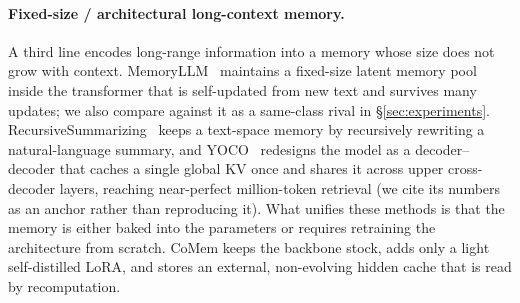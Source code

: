 \paragraph{Fixed-size / architectural long-context memory.} A third line encodes
long-range information into a memory whose size does not grow with context.
MemoryLLM~\citep{memoryllm} maintains a fixed-size latent memory pool inside the
transformer that is self-updated from new text and survives many updates; we
also compare against it as a same-class rival in \S\ref{sec:experiments}.
RecursiveSummarizing~\citep{recsum} keeps a text-space memory by recursively
rewriting a natural-language summary, and YOCO~\citep{yoco} redesigns the model
as a decoder--decoder that caches a single global KV once and shares it across
upper cross-decoder layers, reaching near-perfect million-token retrieval (we
cite its numbers as an anchor rather than reproducing it). What unifies these
methods is that the memory is either baked into the parameters or requires
retraining the architecture from scratch. CoMem keeps the backbone stock, adds
only a light self-distilled LoRA, and stores an external, non-evolving hidden
cache that is read by recomputation.

